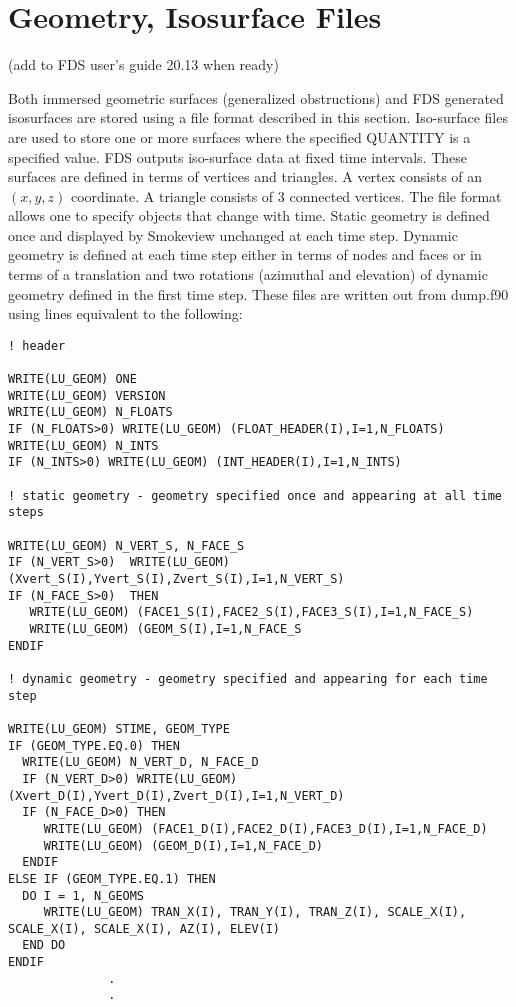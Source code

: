 \documentclass[12pt]{article}
\begin{document}
\vspace{\baselineskip}

\section{Geometry, Isosurface Files}
\label{out:GEOMETRY}

(add to FDS user's guide 20.13 when ready)

Both immersed geometric surfaces (generalized obstructions) and FDS generated isosurfaces are stored using a file format described in this section. Iso-surface files are used to store one or more surfaces where the specified {\ct QUANTITY} is a specified value. FDS outputs iso-surface data at fixed time intervals.  These surfaces are defined in terms of vertices and triangles.  A vertex consists of an $(x,y,z)$ coordinate. A triangle consists of 3 connected vertices.  The file format allows one to specify objects that change with time. Static geometry is defined once and displayed by Smokeview unchanged at each time step. Dynamic geometry is defined at each time step either in terms of nodes and faces or in terms of a translation and two rotations (azimuthal and elevation) of dynamic geometry defined in the first time step. These files are written out from {\ct dump.f90} using lines equivalent to the following:
\begin{lstlisting}
! header

WRITE(LU_GEOM) ONE
WRITE(LU_GEOM) VERSION
WRITE(LU_GEOM) N_FLOATS
IF (N_FLOATS>0) WRITE(LU_GEOM) (FLOAT_HEADER(I),I=1,N_FLOATS)
WRITE(LU_GEOM) N_INTS
IF (N_INTS>0) WRITE(LU_GEOM) (INT_HEADER(I),I=1,N_INTS)

! static geometry - geometry specified once and appearing at all time steps

WRITE(LU_GEOM) N_VERT_S, N_FACE_S
IF (N_VERT_S>0)  WRITE(LU_GEOM) (Xvert_S(I),Yvert_S(I),Zvert_S(I),I=1,N_VERT_S)
IF (N_FACE_S>0)  THEN
   WRITE(LU_GEOM) (FACE1_S(I),FACE2_S(I),FACE3_S(I),I=1,N_FACE_S)
   WRITE(LU_GEOM) (GEOM_S(I),I=1,N_FACE_S
ENDIF

! dynamic geometry - geometry specified and appearing for each time step

WRITE(LU_GEOM) STIME, GEOM_TYPE
IF (GEOM_TYPE.EQ.0) THEN
  WRITE(LU_GEOM) N_VERT_D, N_FACE_D
  IF (N_VERT_D>0) WRITE(LU_GEOM)(Xvert_D(I),Yvert_D(I),Zvert_D(I),I=1,N_VERT_D)
  IF (N_FACE_D>0) THEN
     WRITE(LU_GEOM) (FACE1_D(I),FACE2_D(I),FACE3_D(I),I=1,N_FACE_D)
     WRITE(LU_GEOM) (GEOM_D(I),I=1,N_FACE_D)
  ENDIF
ELSE IF (GEOM_TYPE.EQ.1) THEN
  DO I = 1, N_GEOMS
     WRITE(LU_GEOM) TRAN_X(I), TRAN_Y(I), TRAN_Z(I), SCALE_X(I), SCALE_X(I), SCALE_X(I), AZ(I), ELEV(I)
  END DO
ENDIF
              .
              .
\end{lstlisting}
\end{document}
